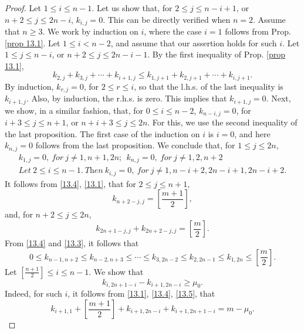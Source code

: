 \documentclass[12pts]{amsart}
\begin{document}
\begin{proof}
Let $1\leq i\leq n-1$. Let us show that, for $2\leq j\leq n-i+1$, or $n+2\leq j\leq 2n-i$, $k_{i,j}=0$. This can be directly verified when $n=2$. Assume that $n\geq 3$. We work by induction on $i$, where the case $i=1$ follows from Prop. \ref{prop 13.1}. Let $1\leq i<n-2$, and assume that our assertion holds for such $i$. Let $1\leq j\leq n-i$, or $n+2\leq j\leq 2n-i-1$. By the first inequality of Prop. \ref{prop 13.1},
$$
k_{2,j}+k_{3,j}+\cdots+k_{i+1,j}\leq k_{1,j+1}+k_{2,j+1}+\cdots+k_{i,j+1}.
$$
By induction, $k_{r,j}=0$, for $2\leq r\leq i$, so that the l.h.s. of the last inequality is $k_{i+1,j}$. Also, by induction, the r.h.s. is zero. This implies that $k_{i+1,j}=0$. Next, we show, in a similar fashion, that, for $0\leq i\leq n-2$, $k_{n-i,j}=0$, for $i+3\leq j\leq n+1$, or $n+i+3\leq j\leq 2n$. For this, we use the second inequality of the last proposition. The first case of the induction on $i$ is $i=0$, and here $k_{n,j}=0$ follows from the last proposition. We conclude that, for $1\leq j\leq 2n$,
\begin{multline}\label{13.4}
k_{1,j}=0,\ \textit{for}\ j\neq 1,n+1,2n;\ \ 
k_{n,j}=0,\ \textit{for}\ j\neq 1,2,n+2\\
\textit{Let}\ 2\leq i\leq n-1.\ \textit{Then}\ k_{i,j}=0, \ \textit{for}\ j\neq 1, n-i+2, 2n-i+1, 2n-i+2.
\end{multline}
It follows from \eqref{13.4}, \eqref{13.1}, that for $2\leq j\leq n+1$, 
\begin{equation}\label{13.5}
k_{n+2-j,j}=[\frac{m+1}{2}],
\end{equation}
and, for $n+2\leq j\leq 2n$,
\begin{equation}\label{13.6}
k_{2n+1-j,j}+k_{2n+2-j,j}=[\frac{m}{2}].
\end{equation}
From \eqref{13.4} and \eqref{13.3}, it follows that
\begin{equation}\label{13.7}
0\leq k_{n-1,n+2}\leq k_{n-2,n+3}\leq\cdots\leq k_{3,2n-2}\leq k_{2,2n-1}\leq k_{1,2n}\leq [\frac{m}{2}].
\end{equation}
Let $[\frac{n+1}{2}]\leq i\leq n-1$. We show that
\begin{equation}\label{13.8}
k_{i,2n+1-i}-k_{i+1,2n-i}\geq \mu_0.
\end{equation}
Indeed, for such $i$, it follows from \eqref{13.1}, \eqref{13.4}, \eqref{13.5}, that
\begin{equation}\label{13.9}
k_{i+1,1}+[\frac{m+1}{2}]+k_{i+1,2n-i}+k_{i+1,2n+1-i}=m-\mu_0.
\end{equation}

\end{proof}
\end{document}
